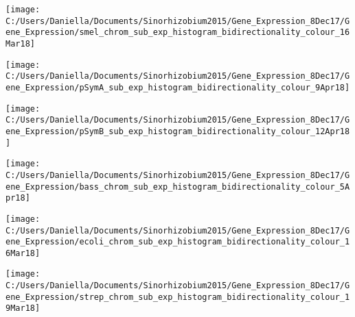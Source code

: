 \documentclass[12pt]{article}
\newcommand{\smel}{\textit{S.\,meliloti}\xspace}
\newcommand{\strep}{\textit{Streptomyces}\xspace}
\newcommand{\bass}{\textit{B.\,subtilis}\xspace}
\newcommand{\ecol}{\textit{E.\,coli}\xspace}
\providecommand{\e}[1]{\ensuremath{\times 10^{#1}}}
\begin{document}
\texttt{[image: C:/Users/Daniella/Documents/Sinorhizobium2015/Gene\_Expression\_8Dec17/Gene\_Expression/smel\_chrom\_sub\_exp\_histogram\_bidirectionality\_colour\_16Mar18]}

\texttt{[image: C:/Users/Daniella/Documents/Sinorhizobium2015/Gene\_Expression\_8Dec17/Gene\_Expression/pSymA\_sub\_exp\_histogram\_bidirectionality\_colour\_9Apr18]}

\texttt{[image: C:/Users/Daniella/Documents/Sinorhizobium2015/Gene\_Expression\_8Dec17/Gene\_Expression/pSymB\_sub\_exp\_histogram\_bidirectionality\_colour\_12Apr18]}

\texttt{[image: C:/Users/Daniella/Documents/Sinorhizobium2015/Gene\_Expression\_8Dec17/Gene\_Expression/bass\_chrom\_sub\_exp\_histogram\_bidirectionality\_colour\_5Apr18]}

\texttt{[image: C:/Users/Daniella/Documents/Sinorhizobium2015/Gene\_Expression\_8Dec17/Gene\_Expression/ecoli\_chrom\_sub\_exp\_histogram\_bidirectionality\_colour\_16Mar18]}

\texttt{[image: C:/Users/Daniella/Documents/Sinorhizobium2015/Gene\_Expression\_8Dec17/Gene\_Expression/strep\_chrom\_sub\_exp\_histogram\_bidirectionality\_colour\_19Mar18]}

%		
%
%
%
\end{document}
